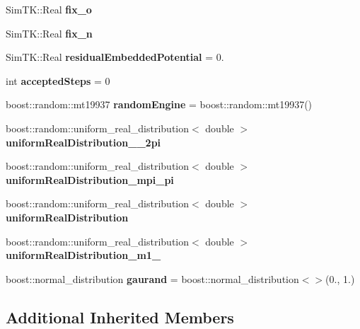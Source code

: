 \begin{DoxyCompactItemize}
\item 
Sim\+T\+K\+::\+Real {\bfseries fix\+\_\+o}\hypertarget{classConformationalSearch_a289685f1a0f36f488310c0d3e5cf9dde}{}\label{classConformationalSearch_a289685f1a0f36f488310c0d3e5cf9dde}

\item 
Sim\+T\+K\+::\+Real {\bfseries fix\+\_\+n}\hypertarget{classConformationalSearch_ac4d43982963f73d8ecfeba740428b4b8}{}\label{classConformationalSearch_ac4d43982963f73d8ecfeba740428b4b8}

\item 
Sim\+T\+K\+::\+Real {\bfseries residual\+Embedded\+Potential} = 0.\hypertarget{classConformationalSearch_a7a7592e9f594d36951150ddf0e640421}{}\label{classConformationalSearch_a7a7592e9f594d36951150ddf0e640421}

\item 
int {\bfseries accepted\+Steps} = 0\hypertarget{classConformationalSearch_aeb36f99ac50811075662bfa812323c59}{}\label{classConformationalSearch_aeb36f99ac50811075662bfa812323c59}

\item 
boost\+::random\+::mt19937 {\bfseries random\+Engine} = boost\+::random\+::mt19937()\hypertarget{classConformationalSearch_a04f9202eee8064ffa5671765c028cb4d}{}\label{classConformationalSearch_a04f9202eee8064ffa5671765c028cb4d}

\item 
boost\+::random\+::uniform\+\_\+real\+\_\+distribution$<$ double $>$ {\bfseries uniform\+Real\+Distribution\+\_\+\_\+2pi}
\item 
boost\+::random\+::uniform\+\_\+real\+\_\+distribution$<$ double $>$ {\bfseries uniform\+Real\+Distribution\+\_\+mpi\+\_\+pi}
\item 
boost\+::random\+::uniform\+\_\+real\+\_\+distribution$<$ double $>$ {\bfseries uniform\+Real\+Distribution}
\item 
boost\+::random\+::uniform\+\_\+real\+\_\+distribution$<$ double $>$ {\bfseries uniform\+Real\+Distribution\+\_\+m1\+\_}
\item 
boost\+::normal\+\_\+distribution {\bfseries gaurand} = boost\+::normal\+\_\+distribution$<$$>$(0., 1.)\hypertarget{classConformationalSearch_ad7edb7b4f9b9c8d3022dc2e73f276435}{}\label{classConformationalSearch_ad7edb7b4f9b9c8d3022dc2e73f276435}

\end{DoxyCompactItemize}
\subsection*{Additional Inherited Members}


